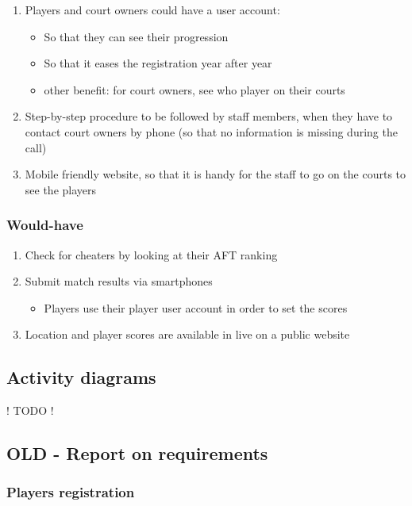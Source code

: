 \begin{enumerate}
\begin{itemize}
		\end{itemize}
	\item Players and court owners could have a user account:
		\begin{itemize}
			\item So that they can see their progression
			\item So that it eases the registration year after year
			\item other benefit: for court owners, see who player on their courts
		\end{itemize}
	\item Step-by-step procedure to be followed by staff members, when they have to contact court owners by phone (so that no information is missing during the call)
	\item Mobile friendly website, so that it is handy for the staff to go on the courts to see the players
\end{enumerate}

\subsubsection{Would-have}

\begin{enumerate}
	\item Check for cheaters by looking at their AFT ranking
	\item Submit match results via smartphones
		\begin{itemize}
			\item Players use their player user account in order to set the scores
		\end{itemize}
	\item Location and player scores are available in live on a public website
\end{enumerate}

\subsection{Activity diagrams}

! TODO !

\subsection{OLD - Report on requirements}

\subsubsection{Players registration}

